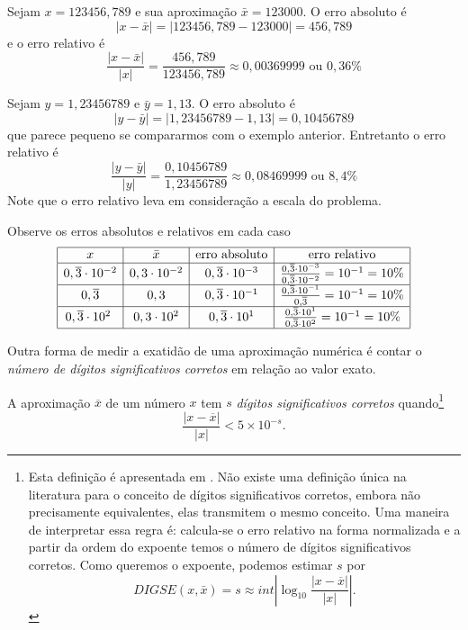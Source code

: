 \documentclass[main.tex]{subfiles}
\begin{document}
\begin{ex}
Sejam $x=123456,789$ e sua aproximação $\bar{x}=123000$. O erro absoluto é
$$
|x-\bar{x}|=|123456,789-123000|=456,789
$$
e o erro relativo é
$$
\frac{|x-\bar{x}|}{|x|}=\frac{456,789}{123456,789}\approx 0,00369999 \text{ ou }0,36\%
$$
\end{ex}

\begin{ex}
Sejam $y=1,23456789$ e $\bar{y}=1,13$. O erro absoluto é
$$
|y-\bar{y}|=|1,23456789-1,13|=0,10456789
$$
que parece pequeno se compararmos com o exemplo anterior. Entretanto o erro relativo é
$$
\frac{|y-\bar{y}|}{|y|}=\frac{0,10456789}{1,23456789}\approx 0,08469999 \text{ ou }8,4\%
$$
Note que o erro relativo leva em consideração a escala do problema.
\end{ex}



\begin{ex}
Observe os erros absolutos e relativos em cada caso
$$
\begin{array}{|c|c|c|c|} \hline
 x & \bar{x} &\hbox{erro absoluto}&\hbox{erro relativo}\\
\hline
0,\overline{3}\cdot 10^{-2} & 0,3\cdot 10^{-2}&0,\overline{3}\cdot 10^{-3}&\frac{0,\overline{3}\cdot 10^{-3}}{0,\overline{3}\cdot 10^{-2}}=10^{-1}=10\%\\ \hline
0,\overline{3}              & 0,3&0,\overline{3}\cdot 10^{-1}&\frac{0,\overline{3}\cdot 10^{-1}}{0,\overline{3}}=10^{-1}=10\%\\ \hline
0,\overline{3}\cdot 10^{2}\ & 0,3\cdot 10^{2}&0,\overline{3}\cdot 10^{1}&\frac{0,\overline{3}\cdot 10^{1}}{0,\overline{3}\cdot 10^{2}}=10^{-1}=10\%\\ \hline
\end{array}
$$
\end{ex}

Outra forma de medir a exatidão de uma aproximação numérica é contar o \emph{número de dígitos significativos corretos} em relação ao valor exato.

\begin{defn}
A aproximação $\overline{x}$ de um número $x$ tem $s$ \emph{dígitos significativos corretos} quando\footnote{Esta definição é apresentada em \cite{Burden2013}. Não existe uma definição única na literatura para o conceito de dígitos significativos corretos, embora não precisamente equivalentes, elas transmitem o mesmo conceito.
Uma maneira de interpretar essa regra é: calcula-se o erro relativo na forma normalizada e a partir da ordem do expoente temos o número de dígitos significativos corretos. Como queremos o expoente, podemos estimar $s$ por
$$ DIGSE(x,\bar{x})=s \approx int \left|\log_{10} \frac{|x-\overline{x}|}{|x|}\right|. $$
}
$$
\frac{|x-\overline{x}|}{|x|} < 5\times 10^{-s}.
$$
\end{defn}
\end{document}
